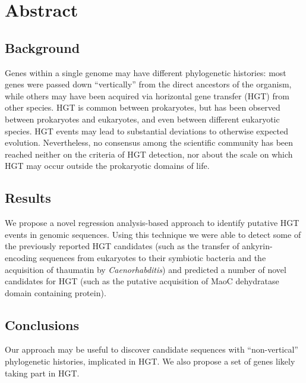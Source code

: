 \section{Abstract}
\label{abstract}

\subsection{Background}
\label{bg}
Genes within a single genome may have different phylogenetic histories: most
genes were passed down ``vertically'' from the direct ancestors of the
organism, while others may have been acquired via horizontal gene transfer
(HGT) from other species. HGT is common between prokaryotes, but has been
observed between prokaryotes and eukaryotes, and even between different
eukaryotic species. HGT events may lead to substantial deviations to otherwise
expected evolution.
Nevertheless, no consensus among the scientific community has been reached
neither on the criteria of HGT detection, nor about the scale on which HGT may
occur outside the prokaryotic domains of life.

\subsection{Results}
\label{res}
We propose a novel regression analysis-based approach to identify putative HGT
events in genomic sequences. Using this technique we were able to detect some
of the previously reported HGT candidates (such as the transfer of
ankyrin-encoding sequences from eukaryotes to their symbiotic bacteria
and the acquisition of thaumatin by \textit{Caenorhabditis}) and predicted a
number of novel candidates for HGT (such as the putative acquisition of MaoC
dehydratase domain containing protein).

\subsection{Conclusions}
\label{concl}
Our approach may be useful to discover candidate sequences with
``non-vertical'' phylogenetic histories, implicated in HGT. We also propose a
set of genes likely taking part in HGT.
